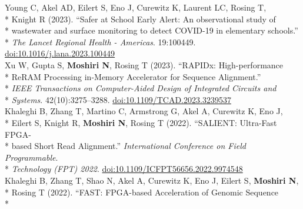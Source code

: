 \documentclass[margin,line]{res}
\begin{document}
\begin{resume}
\hspace*{9.5mm} Young C, Akel AD, Eilert S, Eno J, Curewitz K, Laurent LC, Rosing T,\\*
\hspace*{9.5mm} Knight R (2023). ``Safer at School Early Alert: An observational study of\\*
\hspace*{9.5mm} wastewater and surface monitoring to detect COVID-19 in elementary schools.''\\*\vspace{2mm}
\hspace*{8mm} \textit{The Lancet Regional Health - Americas}. 19:100449. \href{https://doi.org/10.1016/j.lana.2023.100449}{doi:10.1016/j.lana.2023.100449}\\
\hspace*{4mm} Xu W, Gupta S, \textbf{Moshiri N}, Rosing T (2023). ``RAPIDx: High-performance\\*
\hspace*{9.5mm} ReRAM Processing in-Memory Accelerator for Sequence Alignment.''\\*
\hspace*{9.5mm} \textit{IEEE Transactions on Computer-Aided Design of Integrated Circuits and}\\*\vspace{2mm}
\hspace*{8mm} \textit{Systems}. 42(10):3275--3288. \href{https://doi.org/10.1109/TCAD.2023.3239537}{doi:10.1109/TCAD.2023.3239537}\\
\hspace*{4mm} Khaleghi B, Zhang T, Martino C, Armstrong G, Akel A, Curewitz K, Eno J,\\*
\hspace*{9.5mm} Eilert S, Knight R, \textbf{Moshiri N}, Rosing T (2022). ``SALIENT: Ultra-Fast FPGA-\\*
\hspace*{9.5mm} based Short Read Alignment.'' \textit{International Conference on Field Programmable}.\\*\vspace{2mm}
\hspace*{7mm} \textit{Technology (FPT) 2022}. \href{https://doi.org/10.1109/ICFPT56656.2022.9974548}{doi:10.1109/ICFPT56656.2022.9974548}\\
\hspace*{4mm} Khaleghi B, Zhang T, Shao N, Akel A, Curewitz K, Eno J, Eilert S, \textbf{Moshiri N},\\*
\hspace*{9.5mm} Rosing T (2022). ``FAST: FPGA-based Acceleration of Genomic Sequence\\*

\end{resume}
\end{document}
